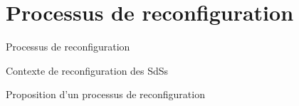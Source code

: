 \section{Processus de reconfiguration} 

\begin{frame}{Processus de reconfiguration}
\end{frame}

\begin{frame}{Contexte de reconfiguration des SdSs}
\end{frame}

\begin{frame}{Proposition d'un processus de reconfiguration}
\end{frame}
